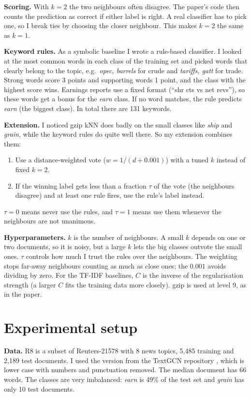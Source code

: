 \documentclass{COMPXXXX}
\begin{document}
\textbf{Scoring.} With $k{=}2$ the two neighbours often disagree. The paper's code then counts the prediction as correct if either label is right. A real classifier has to pick one, so I break ties by choosing the closer neighbour. This makes $k{=}2$ the same as $k{=}1$.

\textbf{Keyword rules.} As a symbolic baseline I wrote a rule-based classifier. I looked at the most common words in each class of the training set and picked words that clearly belong to the topic, e.g.\ \emph{opec, barrels} for crude and \emph{tariffs, gatt} for trade. Strong words score 3 points and supporting words 1 point, and the class with the highest score wins. Earnings reports use a fixed format (``shr cts vs net revs''), so these words get a bonus for the \emph{earn} class. If no word matches, the rule predicts \emph{earn} (the biggest class). In total there are 131 keywords.

\textbf{Extension.} I noticed gzip kNN does badly on the small classes like \emph{ship} and \emph{grain}, while the keyword rules do quite well there. So my extension combines them:
\begin{enumerate}
\item Use a distance-weighted vote ($w = 1/(d+0.001)$) with a tuned $k$ instead of fixed $k{=}2$.
\item If the winning label gets less than a fraction $\tau$ of the vote (the neighbours disagree) and at least one rule fires, use the rule's label instead.
\end{enumerate}
$\tau{=}0$ means never use the rules, and $\tau{=}1$ means use them whenever the neighbours are not unanimous.

\textbf{Hyperparameters.} $k$ is the number of neighbours. A small $k$ depends on one or two documents, so it is noisy, but a large $k$ lets the big classes outvote the small ones. $\tau$ controls how much I trust the rules over the neighbours. The weighting stops far-away neighbours counting as much as close ones; the $0.001$ avoids dividing by zero. For the TF-IDF baselines, $C$ is the inverse of the regularisation strength (a larger $C$ fits the training data more closely). gzip is used at level 9, as in the paper.

\section{Experimental setup}
\textbf{Data.} R8 is a subset of Reuters-21578 with 8 news topics, 5,485 training and 2,189 test documents. I used the version from the TextGCN repository \cite{yao2019}, which is lower case with numbers and punctuation removed. The median document has 66 words. The classes are very imbalanced: \emph{earn} is 49\% of the test set and \emph{grain} has only 10 test documents.
\end{document}
